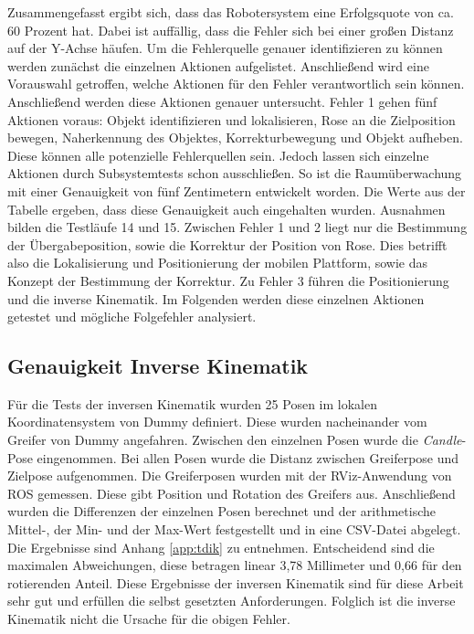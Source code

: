 Zusammengefasst ergibt sich, dass das Robotersystem eine Erfolgsquote von ca. 60 Prozent hat. Dabei ist auffällig, dass die Fehler sich bei einer großen Distanz auf der Y-Achse häufen. Um die Fehlerquelle genauer identifizieren zu können werden zunächst die einzelnen Aktionen aufgelistet. Anschließend wird eine Vorauswahl getroffen, welche Aktionen für den Fehler verantwortlich sein können. Anschließend werden diese Aktionen genauer untersucht. Fehler 1 gehen fünf Aktionen voraus: Objekt identifizieren und lokalisieren, Rose an die Zielposition bewegen, Naherkennung des Objektes, Korrekturbewegung und Objekt aufheben. Diese können alle potenzielle Fehlerquellen sein. Jedoch lassen sich einzelne Aktionen durch Subsystemtests schon ausschließen. So ist die Raumüberwachung mit einer Genauigkeit von fünf Zentimetern entwickelt worden. Die Werte aus der Tabelle ergeben, dass diese Genauigkeit auch eingehalten wurden. Ausnahmen bilden die Testläufe 14 und 15. Zwischen Fehler 1 und 2 liegt nur die Bestimmung der Übergabeposition, sowie die Korrektur der Position von Rose. Dies betrifft also die Lokalisierung und Positionierung der mobilen Plattform, sowie das Konzept der Bestimmung der Korrektur. Zu Fehler 3 führen die Positionierung und die inverse Kinematik. Im Folgenden werden diese einzelnen Aktionen getestet und mögliche Folgefehler analysiert.

\subsection{Genauigkeit Inverse Kinematik}
\label{sec:iktest}
Für die Tests der inversen Kinematik wurden 25 Posen im lokalen Koordinatensystem von Dummy definiert. Diese wurden nacheinander vom Greifer von Dummy angefahren. Zwischen den einzelnen Posen wurde die \textit{Candle}-Pose eingenommen. Bei allen Posen wurde die Distanz zwischen Greiferpose und Zielpose aufgenommen. Die Greiferposen wurden mit der RViz-Anwendung von ROS gemessen. Diese gibt Position und Rotation des Greifers aus. Anschließend wurden die Differenzen der einzelnen Posen berechnet und der arithmetische Mittel-, der Min- und der Max-Wert festgestellt und in eine CSV-Datei abgelegt. Die Ergebnisse sind Anhang \ref{app:tdik} zu entnehmen. Entscheidend sind die maximalen Abweichungen, diese betragen linear 3,78 Millimeter und 0,66 \textdegree für den rotierenden Anteil. Diese Ergebnisse der inversen Kinematik sind für diese Arbeit sehr gut und erfüllen die selbst gesetzten Anforderungen. Folglich ist die inverse Kinematik nicht die Ursache für die obigen Fehler.

